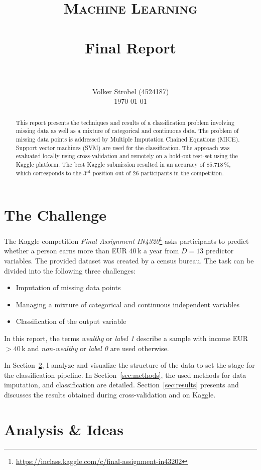 \documentclass[a4paper,11pt]{article}
\title{
		\vspace{-0.6in} 	
		\usefont{OT1}{bch}{b}{n}
		\normalfont \normalsize \textsc{Machine Learning} \\ [10pt]
		\horrule{0.5pt} \\[0.4cm]
		\huge Final Report \\
		\horrule{2pt} \\[0.5cm]
}
\author{
		\normalfont 								\normalsize
        Volker Strobel (4524187)\\[3pt]		\normalsize
        \today
}
\date{}
\begin{document}
\maketitle
\begin{abstract}
  This report presents the techniques and results of a classification
  problem involving missing data as well as a mixture of categorical
  and continuous data. The problem of missing data points is addressed
  by Multiple Imputation Chained Equations (MICE). Support vector
  machines (SVM) are used for the classification. The approach was
  evaluated locally using cross-validation and remotely on a hold-out
  test-set using the Kaggle platform. The best Kaggle submission
  resulted in an accuracy of $85.718\,\%$, which corresponds to the
  $3^{\text{rd}}$ position out of $26$ participants in the
  competition.%
\end{abstract}%
\section{The Challenge}
\label{sec:introduction}

The Kaggle competition \emph{Final Assignment
  IN4320}\footnote{\url{https://inclass.kaggle.com/c/final-assignment-in43202}}
asks participants to predict whether a person earns more than EUR
40\,k a year from $D = 13$ predictor variables. The provided dataset
was created by a census bureau. The task can be divided into the
following three challenges:

\begin{itemize}
\item Imputation of missing data points
\item Managing a mixture of categorical and continuous independent
  variables
\item Classification of the output variable
\end{itemize}

In this report, the terms \emph{wealthy} or \emph{label 1} describe a
sample with income EUR $>40\,$k and \emph{non-wealthy} or \emph{label
  0} are used otherwise.

In Section~\ref{sec:analysis}, I analyze and visualize the structure
of the data to set the stage for the classification pipeline. In
Section~\ref{sec:methods}, the used methods for data imputation, and
classification are detailed. Section~\ref{sec:results} presents and
discusses the results obtained during cross-validation and on Kaggle.

\section{Analysis \& Ideas}
\label{sec:analysis}
\end{document}
